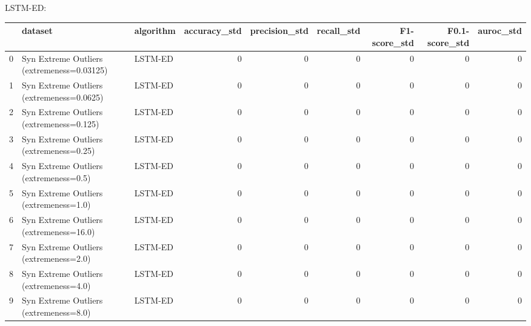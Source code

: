 LSTM-ED:

\begin{tabular}{rllrrrrrr}
\hline
    & dataset                                    & algorithm   &   accuracy\_std &   precision\_std &   recall\_std &   F1-score\_std &   F0.1-score\_std &   auroc\_std \\
\hline
  0 & Syn Extreme Outliers (extremeness=0.03125) & LSTM-ED     &              0 &               0 &            0 &              0 &                0 &           0 \\
  1 & Syn Extreme Outliers (extremeness=0.0625)  & LSTM-ED     &              0 &               0 &            0 &              0 &                0 &           0 \\
  2 & Syn Extreme Outliers (extremeness=0.125)   & LSTM-ED     &              0 &               0 &            0 &              0 &                0 &           0 \\
  3 & Syn Extreme Outliers (extremeness=0.25)    & LSTM-ED     &              0 &               0 &            0 &              0 &                0 &           0 \\
  4 & Syn Extreme Outliers (extremeness=0.5)     & LSTM-ED     &              0 &               0 &            0 &              0 &                0 &           0 \\
  5 & Syn Extreme Outliers (extremeness=1.0)     & LSTM-ED     &              0 &               0 &            0 &              0 &                0 &           0 \\
  6 & Syn Extreme Outliers (extremeness=16.0)    & LSTM-ED     &              0 &               0 &            0 &              0 &                0 &           0 \\
  7 & Syn Extreme Outliers (extremeness=2.0)     & LSTM-ED     &              0 &               0 &            0 &              0 &                0 &           0 \\
  8 & Syn Extreme Outliers (extremeness=4.0)     & LSTM-ED     &              0 &               0 &            0 &              0 &                0 &           0 \\
  9 & Syn Extreme Outliers (extremeness=8.0)     & LSTM-ED     &              0 &               0 &            0 &              0 &                0 &           0 \\
\hline
\end{tabular}

